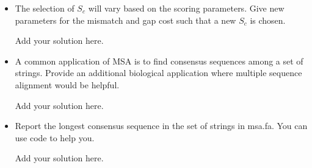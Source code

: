 \begin{itemize}
\item The selection of $S_c$ will vary based on the scoring parameters. Give new parameters for the mismatch and gap cost such that a new $S_c$ is chosen.
\begin{solution}
Add your solution here.
\end{solution}
\item A common application of MSA is to find consensus sequences among a set of strings. Provide an additional biological application where multiple sequence alignment would be helpful.
\begin{solution}
Add your solution here.
\end{solution}
\item Report the longest consensus sequence in the set of strings in msa.fa. You can use code to help you.
\begin{solution}
Add your solution here.
\end{solution}
\end{itemize}
